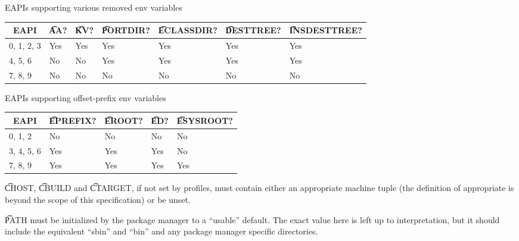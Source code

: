 \begin{centertable}{EAPIs supporting various removed env variables}
    \label{tab:removed-env-vars-table}
    \begin{tabular}{lllllll}
      \toprule
      \multicolumn{1}{c}{\textbf{EAPI}} &
      \multicolumn{1}{c}{\textbf{\t{AA}?}} &
      \multicolumn{1}{c}{\textbf{\t{KV}?}} &
      \multicolumn{1}{c}{\textbf{\t{PORTDIR}?}} &
      \multicolumn{1}{c}{\textbf{\t{ECLASSDIR}?}} &
      \multicolumn{1}{c}{\textbf{\t{DESTTREE}?}} &
      \multicolumn{1}{c}{\textbf{\t{INSDESTTREE}?}} \\
      \midrule
      0, 1, 2, 3        & Yes & Yes & Yes & Yes & Yes & Yes \\
      4, 5, 6           & No  & No  & Yes & Yes & Yes & Yes \\
      7, 8, 9           & No  & No  & No  & No  & No  & No  \\
      \bottomrule
    \end{tabular}
\end{centertable}

\begin{centertable}{EAPIs supporting offset-prefix env variables}
    \label{tab:offset-env-vars-table}
    \begin{tabular}{lllll}
      \toprule
      \multicolumn{1}{c}{\textbf{EAPI}} &
      \multicolumn{1}{c}{\textbf{\t{EPREFIX}?}} &
      \multicolumn{1}{c}{\textbf{\t{EROOT}?}} &
      \multicolumn{1}{c}{\textbf{\t{ED}?}} &
      \multicolumn{1}{c}{\textbf{\t{ESYSROOT}?}} \\
      \midrule
      0, 1, 2           & No  & No  & No  & No  \\
      3, 4, 5, 6        & Yes & Yes & Yes & No  \\
      7, 8, 9           & Yes & Yes & Yes & Yes \\
      \bottomrule
    \end{tabular}
\end{centertable}

\t{CHOST}, \t{CBUILD} and \t{CTARGET}, if not set by profiles, must contain either an appropriate
machine tuple (the definition of appropriate is beyond the scope of this specification) or be unset.

\t{PATH} must be initialized by the package manager to a ``usable'' default.  The exact value here
is left up to interpretation, but it should include the equivalent ``sbin'' and ``bin'' and any
package manager specific directories.

